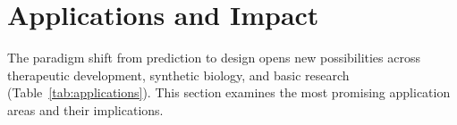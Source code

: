 
\section{Applications and Impact}
\label{sec:applications}

The paradigm shift from prediction to design opens new possibilities across therapeutic development, synthetic biology, and basic research (Table~\ref{tab:applications}). This section examines the most promising application areas and their implications.

%
%
%
%
%
%
%
%
